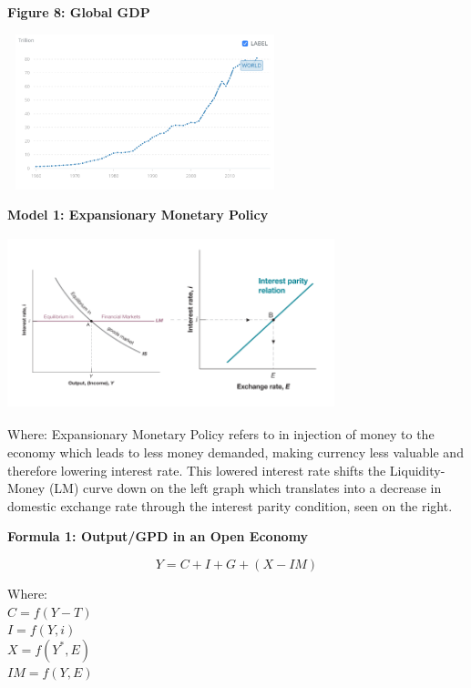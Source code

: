 \documentclass[11pt, english]{article}
\begin{document}
        \textbf{Figure 8: Global GDP}

        \begin{center}
                \includegraphics[width=8cm,height=4.5cm]{BF201-IMG/9.png}
        \end{center}

	\textbf{Model 1: Expansionary Monetary Policy}

	\begin{center}
		\includegraphics[width=9.5cm,height=5cm]{BF201-IMG/7.png}
	\end{center}

	Where: Expansionary Monetary Policy refers to in injection of money to the economy which leads to less money demanded, making currency less valuable and therefore lowering interest rate. This lowered interest rate shifts the Liquidity-Money (LM) curve down on the left graph which translates into a decrease in domestic exchange rate through the interest parity condition, seen on the right.

	\textbf{Formula 1: Output/GPD in an Open Economy}

	$$Y=C+I+G+(X-IM)$$

	Where:\\
	$C=f(Y-T)$\\
	$I=f(Y,i)$\\
	$X=f(Y^*,E)$\\
	$IM=f(Y,E)$\\
\end{document}
